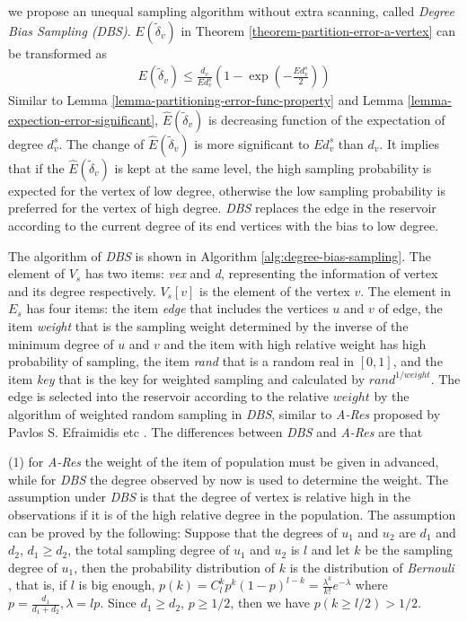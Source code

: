 \documentclass{sig-alternate-2013}
\begin{document}
we propose an unequal sampling algorithm without extra scanning, called \textit{Degree Bias Sampling (DBS)}.
$E(\tilde\delta_v)$ in Theorem \ref{theorem-partition-error-a-vertex} can be transformed as
\begin{eqnarray}\label{lemma-partitioning-error-func-of-expection-of-d}
{E(\tilde\delta_v)} \leq \frac{d_v}{Ed_v^s} (1-\exp(-\frac{Ed_v^s}{2}))
\end{eqnarray}
Similar to Lemma \ref{lemma-partitioning-error-func-property} and Lemma \ref{lemma-expection-error-significant}, $\hat{E}(\tilde\delta_v)$ is decreasing function of the expectation of degree $d_v^s$. The change of $\hat{E}(\tilde\delta_v)$ is more significant to $Ed_v^s$ than $d_v$. It implies that if the $\hat{E}(\tilde\delta_v)$ is kept at the same level, the high sampling probability is expected for the vertex of low degree, otherwise the low sampling probability is preferred for the vertex of high degree. \textit{DBS} replaces the edge in the reservoir according to the current degree of its end vertices with the bias to low degree.

The algorithm of \textit{DBS} is shown in Algorithm \ref{alg:degree-bias-sampling}. The element of $V_s$ has two items: \textit{vex} and \textit{d}, representing the information of vertex and its degree respectively. $V_s[v]$ is the element of the vertex $v$. The element in $E_s$ has four items: the item \textit{edge} that includes the vertices $u$ and $v$ of edge, the item \textit{weight} that is the sampling weight determined by the inverse of the minimum degree of $u$ and $v$ and the item with high relative weight has high probability of sampling,  the item \textit{rand} that is a random real in $[0,1]$, and the item \textit{key} that is the key for weighted sampling and calculated by ${rand}^{1/weight}$.   The edge is selected into the reservoir according to the relative $weight$ by the algorithm of weighted random sampling in \textit{DBS}, similar to \textit{A-Res} proposed by Pavlos S. Efraimidis etc \cite{Pavlos:weightedsampling}. The differences between \textit{DBS} and \textit{A-Res} are that

(1)  for \textit{A-Res} the weight of the item of population must be given in advanced, while for \textit{DBS} the degree observed by now is used to determine the weight. The assumption under \textit{DBS} is that  the degree of vertex is relative high in the observations if it is of the high relative degree in the population.  The assumption can be proved by the following:
Suppose that the degrees of $u_1$ and $u_2$ are $d_1$ and $d_2$, $d_1\ge d_2$,  the total sampling degree of  $u_1$ and $u_2$ is $l$ and let $k$ be the sampling degree of $u_1$, then the probability distribution of $k$ is the distribution of \textit{Bernouli} , that is, if $l$ is big enough,  $ p(k)=C_l^k p^k(1-p)^{l-k} = \frac{\lambda^k}{k!} e^{-\lambda}$ where $p=\frac{d_1}{d_1+d_2}, \lambda = l p$. Since $d_1\ge d_2$, $p\ge1/2$, then we have $p(k\ge l/2)>1/2$.
\end{document}
